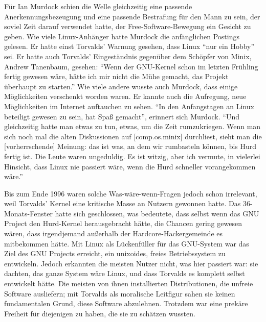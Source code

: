 Für Ian Murdock schien die Welle gleichzeitig eine passende Anerkennungsbezeugung und eine passende Bestrafung für den Mann zu sein, der soviel Zeit darauf verwendet hatte, der Free-Software-Bewegung ein Gesicht zu geben. Wie viele Linux-Anhänger hatte Murdock die anfänglichen Postings gelesen. Er hatte einst Torvalds' Warnung gesehen, dass Linux "`nur ein Hobby"' sei. Er hatte auch Torvalds' Eingeständnis gegenüber dem Schöpfer von Minix, Andrew Tanenbaum, gesehen: "`Wenn der GNU-Kernel schon im letzten Frühling fertig gewesen wäre, hätte ich mir nicht die Mühe gemacht, das Projekt überhaupt zu starten."'\footnotemark{} Wie viele andere wusste auch Murdock, dass einige Möglichkeiten verschenkt worden waren. Er kannte auch die Aufregung, neue Möglichkeiten im Internet auftauchen zu sehen.
"`In den Anfangstagen an Linux beteiligt gewesen zu sein, hat Spaß gemacht"', erinnert sich Murdock. "`Und gleichzeitig hatte man etwas zu tun, etwas, um die Zeit rumzukriegen. Wenn man sich noch mal die alten Diskussionen auf [comp.os.minix] durchliest, sieht man die [vorherrschende] Meinung: das ist was, an dem wir rumbasteln können, bis Hurd fertig ist. Die Leute waren ungeduldig. Es ist witzig, aber ich vermute, in vielerlei Hinsicht, dass Linux nie passiert wäre, wenn die Hurd schneller vorangekommen wäre."'


Bis zum Ende 1996 waren solche Was-wäre-wenn-Fragen jedoch schon irrelevant, weil Torvalds' Kernel eine kritische Masse an Nutzern gewonnen hatte. Das 36-Monats-Fenster hatte sich geschlossen, was bedeutete, dass selbst wenn das GNU Project den Hurd-Kernel herausgebracht hätte, die Chancen gering gewesen wären, dass irgendjemand außerhalb der Hardcore-Hackergemeinde es mitbekommen hätte. Mit Linux als Lückenfüller für das GNU-System war das Ziel des GNU Projects erreicht, ein unixoides, freies Betriebssystem zu entwickeln. Jedoch erkannten die meisten Nutzer nicht, was hier passiert war: sie dachten, das ganze System wäre Linux, und dass Torvalds es komplett selbst entwickelt hätte. Die meisten von ihnen installierten Distributionen, die unfreie Software ausliefern; mit Torvalds als moralische Leitfigur sahen sie keinen fundamentalen Grund, diese Software abzulehnen. Trotzdem war eine prekäre Freiheit für diejenigen zu haben, die sie zu schätzen wussten.

